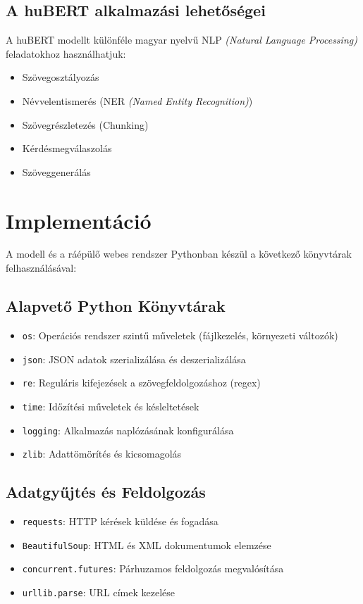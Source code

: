 \documentclass[12pt]{article}
\begin{document}
\subsection{A huBERT alkalmazási lehetőségei}
A huBERT modellt különféle magyar nyelvű NLP \textit{(Natural Language Processing)} feladatokhoz használhatjuk:

\begin{itemize}
    \item Szövegosztályozás
    \item Névvelentismerés (NER \textit{(Named Entity Recognition)})
    \item Szövegrészletezés (Chunking)
    \item Kérdésmegválaszolás
    \item Szöveggenerálás
\end{itemize}

\section{Implementáció}
A modell és a ráépülő webes rendszer Pythonban készül a következő könyvtárak felhasználásával:

\subsection{Alapvető Python Könyvtárak}

\begin{itemize}
    \item \texttt{os}: Operációs rendszer szintű műveletek (fájlkezelés, környezeti változók)
    \item \texttt{json}: JSON adatok szerializálása és deszerializálása
    \item \texttt{re}: Reguláris kifejezések a szövegfeldolgozáshoz (regex)
    \item \texttt{time}: Időzítési műveletek és késleltetések
    \item \texttt{logging}: Alkalmazás naplózásának konfigurálása
    \item \texttt{zlib}: Adattömörítés és kicsomagolás
\end{itemize}

\subsection{Adatgyűjtés és Feldolgozás}

\begin{itemize}
    \item \texttt{requests}: HTTP kérések küldése és fogadása
    \item \texttt{BeautifulSoup}: HTML és XML dokumentumok elemzése
    \item \texttt{concurrent.futures}: Párhuzamos feldolgozás megvalósítása
    \item \texttt{urllib.parse}: URL címek kezelése
\end{itemize}
\end{document}
